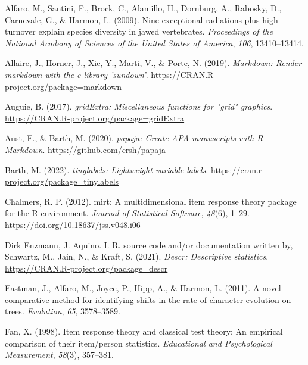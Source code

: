 \documentclass[
  man]{apa6}
\newlength{\cslhangindent}
\newlength{\cslentryspacingunit} %
\newenvironment{CSLReferences}[2] %
 {%
  \setlength{\parindent}{0pt}
  \ifodd #1
  \let\oldpar\par
  \def\par{\hangindent=\cslhangindent\oldpar}
  \fi
  \setlength{\parskip}{#2\cslentryspacingunit}
 }%
 {}
\begin{document}
\hypertarget{refs}{}
\begin{CSLReferences}{1}{0}
\leavevmode{}%
Alfaro, M., Santini, F., Brock, C., Alamillo, H., Dornburg, A., Rabosky, D., Carnevale, G., \& Harmon, L. (2009). Nine exceptional radiations plus high turnover explain species diversity in jawed vertebrates. \emph{Proceedings of the National Academy of Sciences of the United States of America}, \emph{106}, 13410--13414.

\leavevmode{}%
Allaire, J., Horner, J., Xie, Y., Marti, V., \& Porte, N. (2019). \emph{Markdown: Render markdown with the c library 'sundown'}. \url{https://CRAN.R-project.org/package=markdown}

\leavevmode{}%
Auguie, B. (2017). \emph{gridExtra: Miscellaneous functions for "grid" graphics}. \url{https://CRAN.R-project.org/package=gridExtra}

\leavevmode{}%
Aust, F., \& Barth, M. (2020). \emph{{papaja}: {Create} {APA} manuscripts with {R Markdown}}. \url{https://github.com/crsh/papaja}

\leavevmode{}%
Barth, M. (2022). \emph{{tinylabels}: Lightweight variable labels}. \url{https://cran.r-project.org/package=tinylabels}

\leavevmode{}%
Chalmers, R. P. (2012). {mirt}: A multidimensional item response theory package for the {R} environment. \emph{Journal of Statistical Software}, \emph{48}(6), 1--29. \url{https://doi.org/10.18637/jss.v048.i06}

\leavevmode{}%
Dirk Enzmann, J. Aquino. I. R. source code and/or documentation written by, Schwartz, M., Jain, N., \& Kraft, S. (2021). \emph{Descr: Descriptive statistics}. \url{https://CRAN.R-project.org/package=descr}

\leavevmode{}%
Eastman, J., Alfaro, M., Joyce, P., Hipp, A., \& Harmon, L. (2011). A novel comparative method for identifying shifts in the rate of character evolution on trees. \emph{Evolution}, \emph{65}, 3578--3589.

\leavevmode{}%
Fan, X. (1998). Item response theory and classical test theory: An empirical comparison of their item/person statistics. \emph{Educational and Psychological Measurement}, \emph{58}(3), 357--381.


\end{CSLReferences}
\end{document}
